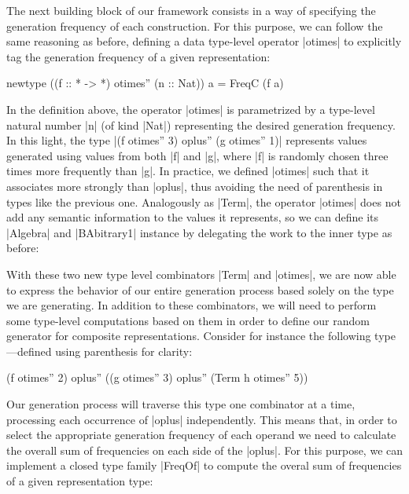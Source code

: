 The next building block of our framework consists in a way of specifying the
generation frequency of each construction.
%
For this purpose, we can follow the same reasoning as before, defining a data
type-level operator |otimes| to explicitly tag the generation frequency of a
given representation:

\begin{code}
newtype ((f :: * -> *) otimes'' (n :: Nat)) a = FreqC (f a)
\end{code}

In the definition above, the operator |otimes| is parametrized by a type-level
natural number |n| (of kind |Nat|) representing the desired generation
frequency.
%
In this light, the type |(f otimes'' 3) oplus'' (g otimes'' 1)| represents
values generated using values from both |f| and |g|, where |f| is randomly
chosen three times more frequently than |g|.
%
In practice, we defined |otimes| such that it associates more strongly than
|oplus|, thus avoiding the need of parenthesis in types like the previous one.
%
Analogously as |Term|, the operator |otimes| does not add any semantic
information to the values it represents, so we can define its |Algebra| and
|BAbitrary1| instance by delegating the work to the inner type as before:



With these two new type level combinators |Term| and |otimes|, we are now able
to express the behavior of our entire generation process based solely on the
type we are generating.
%
In addition to these combinators, we will need to perform some type-level
computations based on them in order to define our random generator for composite
representations.
%
Consider for instance the following type---defined using parenthesis for clarity:

\begin{code}
(f otimes'' 2) oplus'' ((g otimes'' 3) oplus'' (Term h otimes'' 5))
\end{code}

Our generation process will traverse this type one combinator at a time,
processing each occurrence of |oplus| independently.
%
This means that, in order to select the appropriate generation frequency of each
operand we need to calculate the overall sum of frequencies on each side of the
|oplus|.
%
For this purpose, we can implement a closed type family |FreqOf| to compute the
overal sum of frequencies of a given representation type:

